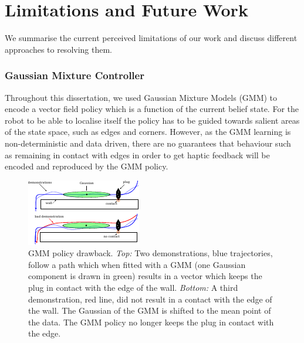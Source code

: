 

\section{Limitations and Future Work}

We summarise the current perceived limitations of our work and discuss different approaches to 
resolving them.

\subsubsection{Gaussian Mixture Controller}
%
%
Throughout this dissertation, we used Gaussian Mixture Models (GMM) to encode a vector 
field policy which is a function of the current belief state. For the robot to be able to localise 
itself the policy has to be guided towards salient areas of the state space, such as edges and corners. 
However, as the GMM learning is non-deterministic and data driven, there are no guarantees that 
behaviour such as remaining in contact with edges in order to get haptic feedback 
will be encoded and reproduced by the GMM policy. 

\begin{figure}[h]
  \centering
  \includegraphics[width=0.9\linewidth]{./ch6-conclusion/Figures/gmm_problem.pdf}
  \caption{GMM policy drawback. \textit{Top:} Two demonstrations, blue trajectories, follow a path
  which when fitted with a GMM (one Gaussian component is drawn in green) results in a vector which keeps the plug 
  in contact with the edge of the wall. \textit{Bottom:} A third demonstration, red line, 
  did not result in a contact with the edge of the wall. The Gaussian of the GMM is shifted to the 
  mean point of the data. The GMM policy no longer keeps the plug in contact with the edge.
  }
  \label{fig:ch6:gmm_traj}
\end{figure}

